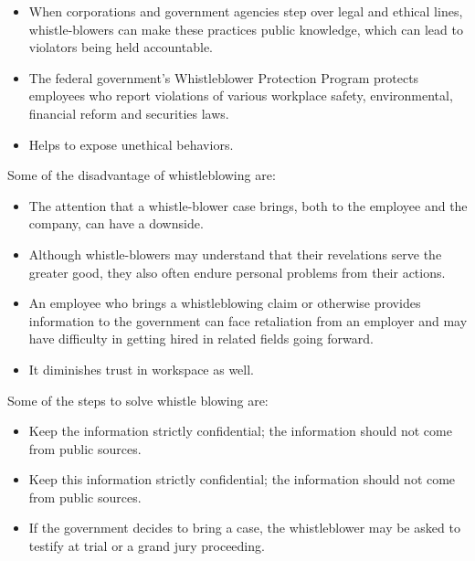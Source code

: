 \documentclass [12pt, a4paper]{article}
\begin{document}
\begin{itemize}
	\item When corporations and government agencies step over legal and ethical lines, whistle-blowers can make these practices public knowledge, which can lead to violators being held accountable.
	\item The federal government's Whistleblower Protection Program protects employees who report violations of various workplace safety, environmental, financial reform and securities laws.
	\item Helps to expose unethical behaviors.
\end{itemize}

Some of the disadvantage of whistleblowing are:
\begin{itemize}
	\item The attention that a whistle-blower case brings, both to the employee and the company, can have a downside. 
	\item Although whistle-blowers may understand that their revelations serve the greater good, they also often endure personal problems from their actions. 
	\item An employee who brings a whistleblowing claim or otherwise provides information to the government can face retaliation from an employer and may have difficulty in getting hired in related fields going forward. 
	\item It diminishes trust in workspace as well.

\end{itemize}

Some of the steps to solve whistle blowing are:

\begin{itemize}
	\item Keep the information strictly confidential; the information should not come from public sources.
	\item Keep this information strictly confidential; the information should not come from public sources.   
	\item If the government decides to bring a case, the whistleblower may be asked to testify at trial or a grand jury proceeding.\\

\end{itemize}
\end{document}
